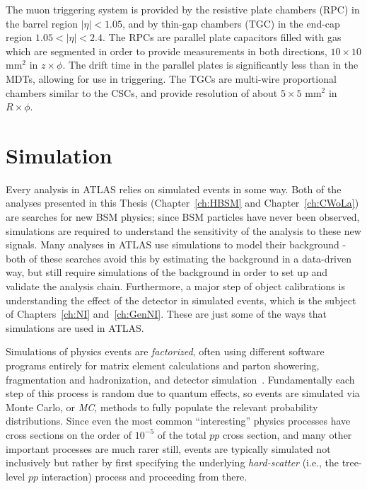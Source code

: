 The muon triggering system is provided by the resistive plate chambers (RPC) in the barrel region $|\eta|<1.05$, and by thin-gap chambers (TGC) in the end-cap region $1.05<|\eta|<2.4$.
The RPCs are parallel plate capacitors filled with gas which are segmented in order to provide measurements in both directions, $10\times 10$ $\text{mm}^2$ in $z \times \phi$.
The drift time in the parallel plates is significantly less than in the MDTs, allowing for use in triggering.
The TGCs are multi-wire proportional chambers similar to the CSCs, and provide resolution of about $5\times 5$ $\text{mm}^2$ in $R \times \phi$.

\section{Simulation}
\label{sec:ATLAS:simulation}
Every analysis in ATLAS relies on simulated events in some way.
Both of the analyses presented in this Thesis (Chapter~\ref{ch:HBSM} and Chapter~\ref{ch:CWoLa}) are searches for new BSM physics; since BSM particles have never been observed, simulations are required to understand the sensitivity of the analysis to these new signals.
Many analyses in ATLAS use simulations to model their background - both of these searches avoid this by estimating the background in a data-driven way, but still require simulations of the background in order to set up and validate the analysis chain.
Furthermore, a major step of object calibrations is understanding the effect of the detector in simulated events, which is the subject of Chapters~\ref{ch:NI} and~\ref{ch:GenNI}.
These are just some of the ways that simulations are used in ATLAS.

Simulations of physics events are \textit{factorized}, often using different software programs entirely for matrix element calculations and parton showering, fragmentation and hadronization, and detector simulation~\cite{powhegintro}.
Fundamentally each step of this process is random due to quantum effects, so events are simulated via Monte Carlo, or \textit{MC}, methods to fully populate the relevant probability distributions.
Since even the most common ``interesting'' physics processes have cross sections on the order of $10^{-5}$ of the total $pp$ cross section, and many other important processes are much rarer still, events are typically simulated not inclusively but rather by first specifying the underlying \textit{hard-scatter} (i.e., the tree-level $pp$ interaction) process and proceeding from there.

